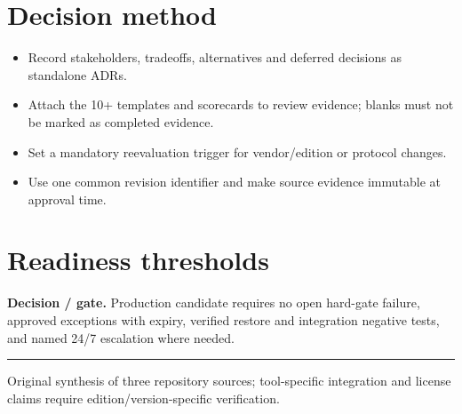 \documentclass[10pt,letterpaper]{article}
\begin{document}
\section{Decision method}
\begin{itemize}
\item Record stakeholders, tradeoffs, alternatives and deferred decisions as standalone ADRs.
\item Attach the 10+ templates and scorecards to review evidence; blanks must not be marked as completed evidence.
\item Set a mandatory reevaluation trigger for vendor/edition or protocol changes.
\item Use one common revision identifier and make source evidence immutable at approval time.
\end{itemize}
\section{Readiness thresholds}
\textbf{Decision / gate.} Production candidate requires no open hard-gate failure, approved exceptions with expiry, verified restore and integration negative tests, and named 24/7 escalation where needed.\par
\vfill\noindent\color{muted}\rule{\linewidth}{0.4pt}\par\scriptsize Original synthesis of three repository sources; tool-specific integration and license claims require edition/version-specific verification.\normalsize
\end{document}
